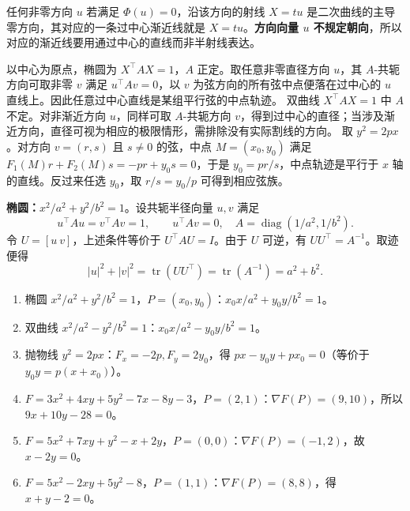 任何非零方向 $u$ 若满足 $\Phi(u)=0$，沿该方向的射线 $X=tu$ 是二次曲线的主导零方向，其对应的一条过中心渐近线就是 $X=tu$。\textbf{方向向量 $u$ 不规定朝向}，所以对应的渐近线要用通过中心的直线而非半射线表达。

 以中心为原点，椭圆为 $X^\top AX=1$，$A$ 正定。取任意非零直径方向 $u$，其 $A$-共轭方向可取非零 $v$ 满足 $u^\top Av=0$，以 $v$ 为弦方向的所有弦中点便落在过中心的 $u$ 直线上。因此任意过中心直线是某组平行弦的中点轨迹。
 双曲线 $X^\top AX=1$ 中 $A$ 不定。对非渐近方向 $u$，同样可取 $A$-共轭方向 $v$，得到过中心的直径；当涉及渐近方向，直径可视为相应的极限情形，需排除没有实际割线的方向。
 取 $y^2=2px$。对方向 $v=(r,s)$ 且 $s\ne0$ 的弦，中点 $M=(x_0,y_0)$ 满足 $F_1(M)r+F_2(M)s=-pr+y_0s=0$，于是 $y_0=pr/s$，中点轨迹是平行于 $x$ 轴的直线。反过来任选 $y_0$，取 $r/s=y_0/p$ 可得到相应弦族。

\textbf{椭圆：}$x^2/a^2+y^2/b^2=1$。设共轭半径向量 $u,v$ 满足
\[u^\top Au=v^\top Av=1,\qquad u^\top Av=0,\quad A=\operatorname{diag}(1/a^2,1/b^2).
\]
令 $U=[u\ v]$，上述条件等价于 $U^\top AU=I$。由于 $U$ 可逆，有 $UU^\top=A^{-1}$。取迹便得
\[|u|^2+|v|^2=\operatorname{tr}(UU^\top)=\operatorname{tr}(A^{-1})=a^2+b^2.\]

\begin{enumerate}
\item 椭圆 $x^2/a^2+y^2/b^2=1$，$P=(x_0,y_0)$：$\boxed{x_0x/a^2+y_0y/b^2=1}$。
\item 双曲线 $x^2/a^2-y^2/b^2=1$：$\boxed{x_0x/a^2-y_0y/b^2=1}$。
\item 抛物线 $y^2=2px$：$F_x=-2p,F_y=2y_0$，得 $\boxed{px-y_0y+px_0=0}$（等价于 $y_0y=p(x+x_0)$）。
\item $F=3x^2+4xy+5y^2-7x-8y-3$，$P=(2,1)$：$\nabla F(P)=(9,10)$，所以 $\boxed{9x+10y-28=0}$。
\item $F=5x^2+7xy+y^2-x+2y$，$P=(0,0)$：$\nabla F(P)=(-1,2)$，故 $\boxed{x-2y=0}$。
\item $F=5x^2-2xy+5y^2-8$，$P=(1,1)$：$\nabla F(P)=(8,8)$，得 $\boxed{x+y-2=0}$。
\end{enumerate}

